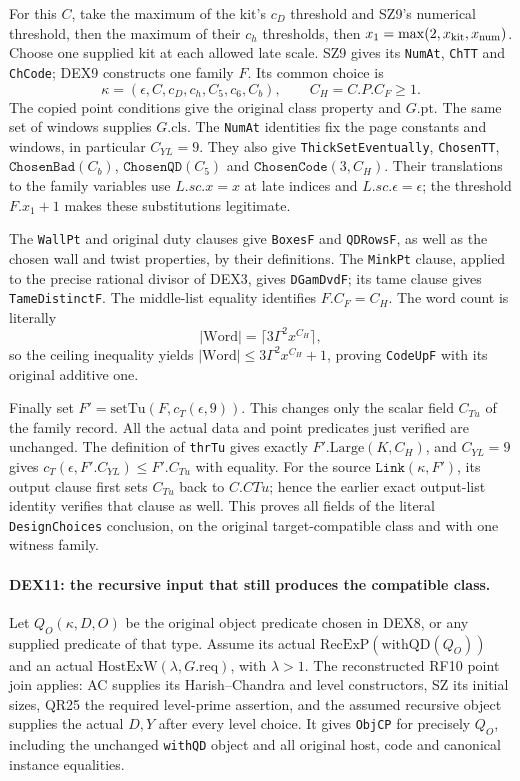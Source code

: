 \documentclass[11pt,a4paper]{article}
\numberwithin{equation}{section}
\theoremstyle{remark}\newtheorem{remark}[theorem]{Remark}
\begin{document}
For this $C$, take the maximum of the kit's $c_D$ threshold and
SZ9's numerical threshold, then the maximum of their $c_h$
thresholds, then $x_1=\max(2,x_{\rm kit},x_{\rm num})$.
Choose one supplied kit at each allowed late scale. SZ9 gives its
\texttt{NumAt}, \texttt{ChTT} and \texttt{ChCode}; DEX9 constructs
one family $F$. Its common choice is
\[
       \kappa=(\epsilon,C,c_D,c_h,C_5,c_6,C_b),
       \qquad C_H=C.P.C_F\ge1.                          \tag{DEX.19}
\]
The copied point conditions give the original class property and
$G.\mathrm{pt}$. The same set of windows supplies $G.\mathrm{cls}$.
The \texttt{NumAt} identities fix the page constants and windows,
in particular $C_{YL}=9$. They also give
\texttt{ThickSetEventually}, \texttt{ChosenTT},
$\texttt{ChosenBad}(C_b)$, $\texttt{ChosenQD}(C_5)$ and
$\texttt{ChosenCode}(3,C_H)$. Their translations to the family
variables use $L.sc.x=x$ at late indices and $L.sc.\epsilon=\epsilon$;
the threshold $F.x_1+1$ makes these substitutions legitimate.

The \texttt{WallPt} and original duty clauses give
\texttt{BoxesF} and \texttt{QDRowsF}, as well as the chosen wall
and twist properties, by their definitions. The \texttt{MinkPt}
clause, applied to the precise rational divisor of DEX3, gives
\texttt{DGamDvdF}; its tame clause gives \texttt{TameDistinctF}.
The middle-list equality identifies $F.C_F=C_H$. The word count
is literally
\[
                 |\mathrm{Word}|=\lceil3\Gamma^2x^{C_H}\rceil,
\]
so the ceiling inequality yields
$|\mathrm{Word}|\le3\Gamma^2x^{C_H}+1$, proving
\texttt{CodeUpF} with its original additive one.

Finally set $F'=\mathrm{setTu}(F,c_T(\epsilon,9))$.
This changes only the scalar field $C_{Tu}$ of the family record.
All the actual data and point predicates just verified are unchanged.
The definition of \texttt{thrTu} gives exactly
$F'.\mathrm{Large}(K,C_H)$, and $C_{YL}=9$ gives
$c_T(\epsilon,F'.C_{YL})\le F'.C_{Tu}$ with equality.
For the source $\texttt{Link}(\kappa,F')$, its output clause first
sets $C_{Tu}$ back to $C.CTu$; hence the earlier exact output-list
identity verifies that clause as well. This proves all fields of
the literal \texttt{DesignChoices} conclusion, on the original
target-compatible class and with one witness family.

\paragraph{DEX11: the recursive input that still produces the compatible class.}
\label{claim:DEX11}
Let $Q_O(\kappa,D,O)$ be the original object predicate chosen in
DEX8, or any supplied predicate of that type. Assume its actual
$\mathrm{RecExP}(\mathrm{withQD}(Q_O))$ and an actual
$\mathrm{HostExW}(\lambda,G.\mathrm{req})$, with $\lambda>1$.
The reconstructed RF10 point join applies: AC supplies its
Harish--Chandra and level constructors, SZ its initial sizes, QR25
the required level-prime assertion, and the assumed recursive
object supplies the actual $D,Y$ after every level choice. It gives
\texttt{ObjCP} for precisely $Q_O$, including the unchanged
\texttt{withQD} object and all original host, code and canonical
instance equalities.
\end{document}
